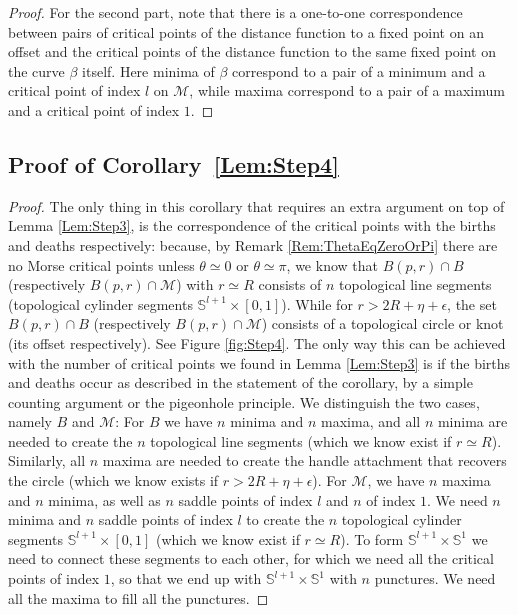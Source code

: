 \documentclass[twoside,leqno]{article}
\newcommand{\M}{\mathcal{M}}
\begin{document}
\begin{proof}
For the second part, note that there is a one-to-one correspondence between pairs of critical points of the distance function to a fixed point on an offset and the critical points of the distance function to the same fixed point on the curve $\beta$ itself. 
{Here minima of $\beta$ correspond to a pair of a minimum and a critical point of index $l$ on $\M$, while maxima correspond to a pair of a maximum and a critical point of index $1$.}
\end{proof} 

\subsection{Proof of Corollary~\ref{Lem:Step4}}

\begin{proof}
The only thing in this corollary that requires an extra argument on top of Lemma \ref{Lem:Step3}, is the correspondence of the critical points with the births and deaths respectively: because, by Remark \ref{Rem:ThetaEqZeroOrPi}  there are no Morse critical points unless $\theta \simeq 0$ or  $\theta \simeq \pi$, we know that $B(p, r) \cap B$ (respectively $B(p, r) \cap \M$) with $r \simeq R$ consists of $n$ topological line segments (topological cylinder segments $\mathbb{S}^{l+1} \times [0,1]$). While for $r > 2 R + \eta +\epsilon$, the set  $B(p, r) \cap B$ (respectively $B(p, r) \cap \M$) consists of a topological circle or knot (its offset respectively). See Figure \ref{fig:Step4}.  The only way this can be achieved with the number of critical points we found in Lemma \ref{Lem:Step3} is if the births and deaths occur as described in the statement of the corollary,  by a simple counting argument or the pigeonhole principle. 
We distinguish the two cases, namely $B$ and $\M$: For $B$ we have $n$ minima and $n$ maxima, and all $n$ minima are needed to create the $n$ topological line segments (which we know exist if $r \simeq R$).  Similarly, all $n$ maxima are needed to create the handle attachment that recovers the circle (which we know exists if $r > 2 R + \eta +\epsilon$). For $\M$,  we have  $n$ maxima and $n$ minima, as well as $n$ saddle points of index $l$ and $n$ of index $1$. We need $n$ minima and $n$ saddle points of index $l$ to create the $n$ topological cylinder segments $\mathbb{S}^{l+1} \times [0,1]$ (which we know exist if $r \simeq R$). To form $\mathbb{S}^{l+1} \times \mathbb{S}^1$ we need to connect these segments to each other, for which we need all the critical points of index $1$, so that we end up with $\mathbb{S}^{l+1} \times \mathbb{S}^1$ with $n$ punctures. We need all the maxima to fill all the punctures. 

\end{proof} 
\end{document}
